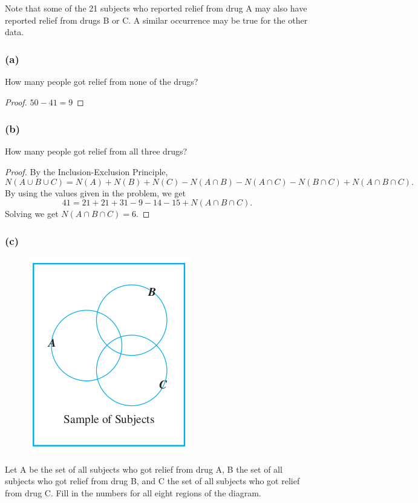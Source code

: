 \documentclass[14pt]{extarticle}
\begin{document}
Note that some of the 21 subjects who reported relief from drug A may also have reported relief from drugs B or C. A 
similar occurrence may be true for the other data.

\subsubsection{(a)}
How many people got relief from none of the drugs?

\begin{proof}
\(50-41=9\)
\end{proof}

\subsubsection{(b)}
How many people got relief from all three drugs?

\begin{proof}
By the Inclusion-Exclusion Principle,
\[
N(A \cup B \cup C) = N(A) + N(B) + N(C) - N(A \cap B) - N(A \cap C) - N(B \cap C) + N(A \cap B \cap C).
\]
By using the values given in the problem, we get
\[
41 = 21 + 21 + 31 - 9 - 14 - 15 + N(A \cap B \cap C).
\]
Solving we get \(N(A \cap B \cap C) = 6\).
\end{proof}

\subsubsection{(c)}
\begin{figure}[ht!]
\centering
\includegraphics[scale=0.5]{../images/9.3.34.c.1.png}
\end{figure}

Let A be the set of all subjects who got relief from drug A, B the set of all subjects who got relief from drug B, 
and C the set of all subjects who got relief from drug C. Fill in the numbers for all eight regions of the diagram.
\end{document}
